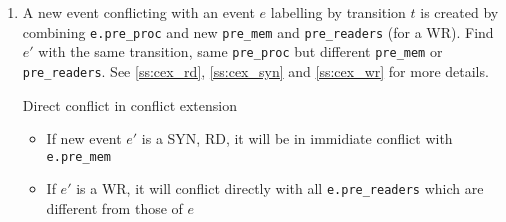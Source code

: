 \documentclass{llncs}
\begin{document}
\begin{enumerate}
\begin{algorithm}{}
\begin{enumerate}
			for each \verb!pre_readers[i]! $(i \in [0..numprocs])$,
			
			set \verb!parent = pre_readers[i]!
			
		\end{enumerate}
		Let's consider $parent$.
		
		\begin{itemize}
			\item
			\verb!parent->trans->type! is RD or SYN: 
			If found(e) in \verb!parent.post_rws!, then $this$ and $e$ are in direct
			conflict
			\item
			\verb!parent->trans->type! is WR: If found(this) and found(e) in the same 
			\verb!parent.post_mem[i]!, then they definitely
			conflict immediately.
		\end{itemize}
		\noindent
		\caption{Check direct conflict between two enabled events}
		\label{a:dicfl}
	\end{algorithm}
	
	\item
	A new event conflicting with an event $e$ labelling by transition $t$ is created by
	combining \verb!e.pre_proc! and new \verb!pre_mem! and \verb!pre_readers! (for a WR).
	Find $e'$ with the same transition, same \verb!pre_proc! but different \verb!pre_mem! or
	\verb!pre_readers!. See \cref{ss:cex_rd}, \cref{ss:cex_syn} and \cref{ss:cex_wr} for more
	details.
	
	\begin{lemma}{Direct conflict in conflict extension}
		\begin{itemize}
			\item
			If new event $e'$ is a SYN, RD, it will be in immidiate conflict with \verb!e.pre_mem!
			\item
			If $e'$ is a WR, it will conflict directly with all \verb!e.pre_readers! which are
			different from those of $e$
		\end{itemize}
	\end{lemma}
	
\end{enumerate}
\end{document}
